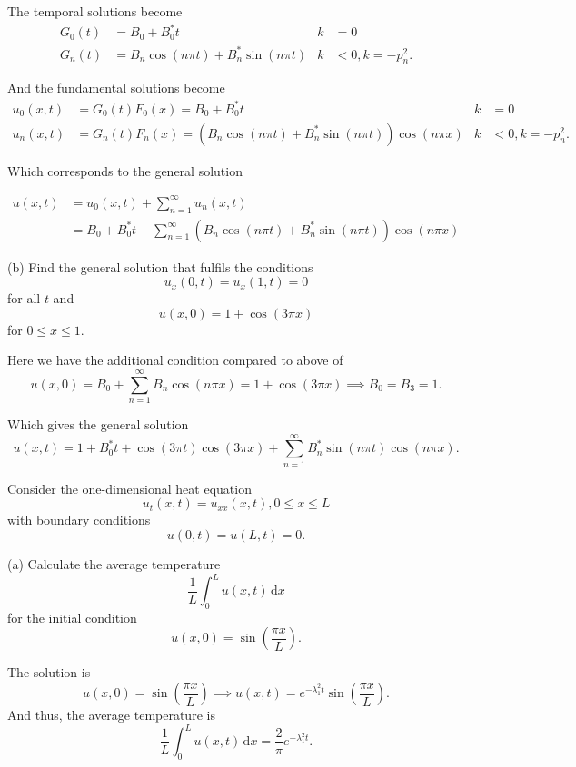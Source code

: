 The temporal solutions become
\begin{align*}
  G_0(t) &= B_0 + B_0^{*} t & k &= 0\\
  G_n(t) &= B_n \cos (n \pi t) + B_n^{*} \sin (n \pi t) & k &<0, k = - p_n^2
.\end{align*}

And the fundamental solutions become
\begin{align*}
  u_0(x,t) &= G_0 (t) F_0(x) = B_0 + B_0^{*}t & k &= 0 \\
  u_n (x,t) &= G_n(t) F_n(x) = (B_n \cos(n \pi t) + B_n^{*} \sin \left( n \pi t \right) ) \cos (n \pi x) & k &<0, k = -p^{2}_n
.\end{align*}

Which corresponds to the general solution

\begin{align*}
  u(x,t) &= u_0(x,t) + \sum_{n = 1}^{\infty} u_n (x,t) \\
         &= B_0 + B_0^{*}t + \sum_{n = 1}^{\infty} \left( B_n \cos \left( n \pi t \right) + B_n^{*} \sin \left( n \pi t \right) \right) \cos \left( n \pi x  \right)
\end{align*}



(b) Find the general solution that fulfils the conditions
\[ 
u_x(0,t) = u_x(1,t) = 0
\]
for all $t$ and
\[ 
u(x,0) = 1 + \cos (3 \pi x)
\]
for $0 \leq x \leq 1$.

\hr

Here we have the additional condition compared to above of
\[ 
u(x,0) = B_0 + \sum_{n = 1}^{\infty} B_n \cos (n \pi x) = 1 + \cos(3 \pi x) \implies B_0 = B_3 = 1
.\]

Which gives the general solution
\[ 
u(x,t) = 1 + B_0^{*}t + \cos (3 \pi t) \cos (3 \pi x) + \sum_{n = 1}^{\infty} B_n^{*} \sin (n \pi t) \cos (n \pi x)
.\]




Consider the one-dimensional heat equation
\[ 
u_t(x,t) = u_{x x}(x,t), 0 \leq x \leq L
\]
with boundary conditions
\[ 
u(0,t) = u(L,t) = 0
.\]

(a) Calculate the average temperature
\[ 
\frac{1}{L} \int_{0}^{L} u(x,t) \, \mathrm{d}x 
\]
for the initial condition
\[ 
u(x,0) = \sin \left( \frac{\pi x}{L} \right)
.\]

\hr


The solution is
\[ 
u(x,0) = \sin \left( \frac{\pi x}{L} \right) \implies u(x,t) = e^{- \lambda_1^2 t} \sin \left( \frac{\pi x}{L} \right)
.\]
And thus, the average temperature is
\[ 
\frac{1}{L} \int_{0}^{L} u(x,t) \, \mathrm{d}x = \frac{2}{\pi } e^{-\lambda_1^2t}
.\]



